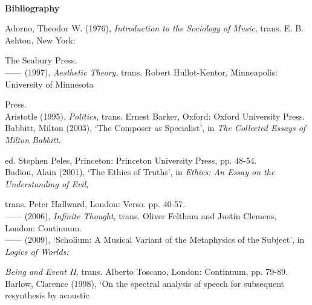 \paragraph{}
\paragraph{}
\begin{flushleft}
\huge 
\marginpar{}
\textbf{Bibliography}
\end{flushleft}
\vspace{20pt} 
\normalsize
\hypertarget{adornointro}{}
Adorno, Theodor W. (1976), \emph{Introduction to the Sociology of Music}, trans. E. B. Ashton, New York: 

The Seabury Press. 
\hypertarget{adornoaesth}{}\\
------ (1997), \emph{Aesthetic Theory}, trans. Robert Hullot-Kentor, Minneapolis: University of Minnesota 

Press. 
\hypertarget{aristotle}{}\\
Aristotle (1995), \emph{Politics}, trans. Ernest Barker, Oxford: Oxford University Press. 
\hypertarget{babbitt}{}\\
Babbitt, Milton (2003), `The Composer as Specialist', in \emph{The Collected Essays of Milton Babbitt}.  

ed. Stephen Peles,  Princeton: Princeton University Press, pp. 48-54.
\hypertarget{badiouethics}{}\\
Badiou, Alain (2001), `The Ethics of Truths', in \emph{Ethics: An Essay on the Understanding of Evil}, 

trans. Peter Hallward, London: Verso. pp. 40-57.
\hypertarget{infthought}{}\\
------ (2006), \emph{Infinite Thought}, trans. Oliver Feltham and Justin Clemens, London: Continuum. 
\hypertarget{badioumus}{}\\
------ (2009), `Scholium: A Musical Variant of the Metaphysics of the Subject', in \emph{Logics of Worlds:}

\emph{Being and Event II}, trans. Alberto Toscano, London: Continuum, pp. 79-89. 
\hypertarget{barlowspec}{}\\
Barlow, Clarence (1998), `On the spectral analysis of speech for subsequent resynthesis by acoustic 

